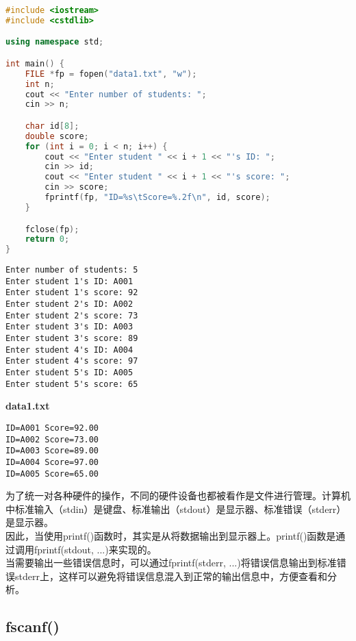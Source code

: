 \begin{lstlisting}[language=C++]
#include <iostream>
#include <cstdlib>

using namespace std;

int main() {
    FILE *fp = fopen("data1.txt", "w");
    int n;
    cout << "Enter number of students: ";
    cin >> n;

    char id[8];
    double score;
    for (int i = 0; i < n; i++) {
        cout << "Enter student " << i + 1 << "'s ID: ";
        cin >> id;
        cout << "Enter student " << i + 1 << "'s score: ";
        cin >> score;
        fprintf(fp, "ID=%s\tScore=%.2f\n", id, score);
    }

    fclose(fp);
    return 0;
}
\end{lstlisting}

\begin{tcolorbox}
    \begin{verbatim}
Enter number of students: 5
Enter student 1's ID: A001
Enter student 1's score: 92
Enter student 2's ID: A002
Enter student 2's score: 73
Enter student 3's ID: A003
Enter student 3's score: 89
Enter student 4's ID: A004
Enter student 4's score: 97
Enter student 5's ID: A005
Enter student 5's score: 65
	\end{verbatim}
\end{tcolorbox}

\begin{tcolorbox}
    \textbf{data1.txt}
    \begin{verbatim}
ID=A001	Score=92.00
ID=A002	Score=73.00
ID=A003	Score=89.00
ID=A004	Score=97.00
ID=A005	Score=65.00
	\end{verbatim}
\end{tcolorbox}

为了统一对各种硬件的操作，不同的硬件设备也都被看作是文件进行管理。计算机中标准输入（stdin）是键盘、标准输出（stdout）是显示器、标准错误（stderr）是显示器。\\

因此，当使用printf()函数时，其实是从将数据输出到显示器上。printf()函数是通过调用fprintf(stdout, ...)来实现的。\\

当需要输出一些错误信息时，可以通过fprintf(stderr, ...)将错误信息输出到标准错误stderr上，这样可以避免将错误信息混入到正常的输出信息中，方便查看和分析。\\

\subsection{fscanf()}

